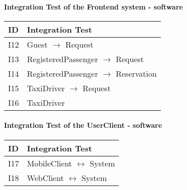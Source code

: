 		\paragraph{Integration Test of the Frontend system - software}
		\begin{tabular}{p{2cm} | p{10cm}} \hline
			\textbf{ID} & \textbf{Integration Test} \\ \hline
			I12 & Guest $\rightarrow$ Request \\ \hline
			I13 & RegisteredPassenger $\rightarrow$ Request \\ \hline
			I14 & RegisteredPassenger $\rightarrow$ Reservation \\ \hline
			I15 & TaxiDriver $\rightarrow$ Request \\ \hline
			I16 & TaxiDriver \\ \hline
		\end{tabular}
		\paragraph{Integration Test of the UserClient - software}
		\begin{tabular}{p{2cm} | p{10cm}} \hline
			\textbf{ID} & \textbf{Integration Test} \\ \hline
			I17 & MobileClient $\leftrightarrow$ System \\ \hline
			I18 & WebClient $\leftrightarrow$ System \\ \hline
		\end{tabular}
